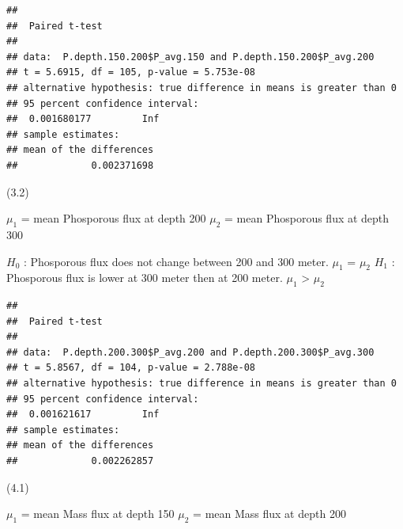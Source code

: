\documentclass[]{article}
\newenvironment{Shaded}{\begin{snugshade}}{\end{snugshade}}
\newcommand{\DataTypeTok}[1]{\textcolor[rgb]{0.13,0.29,0.53}{#1}}
\newcommand{\FloatTok}[1]{\textcolor[rgb]{0.00,0.00,0.81}{#1}}
\newcommand{\KeywordTok}[1]{\textcolor[rgb]{0.13,0.29,0.53}{\textbf{#1}}}
\newcommand{\NormalTok}[1]{#1}
\newcommand{\OperatorTok}[1]{\textcolor[rgb]{0.81,0.36,0.00}{\textbf{#1}}}
\newcommand{\OtherTok}[1]{\textcolor[rgb]{0.56,0.35,0.01}{#1}}
\newcommand{\StringTok}[1]{\textcolor[rgb]{0.31,0.60,0.02}{#1}}
\begin{document}
\begin{verbatim}
## 
##  Paired t-test
## 
## data:  P.depth.150.200$P_avg.150 and P.depth.150.200$P_avg.200
## t = 5.6915, df = 105, p-value = 5.753e-08
## alternative hypothesis: true difference in means is greater than 0
## 95 percent confidence interval:
##  0.001680177         Inf
## sample estimates:
## mean of the differences 
##             0.002371698
\end{verbatim}

(3.2)

\(\mu_1\) = mean Phosporous flux at depth 200 \(\mu_2\) = mean
Phosporous flux at depth 300

\(H_0\) : Phosporous flux does not change between 200 and 300 meter.
\(\mu_1\) = \(\mu_2\) \(H_1\) : Phosporous flux is lower at 300 meter
then at 200 meter. \(\mu_1\) \textgreater{} \(\mu_2\)

\begin{Shaded}
\end{Shaded}

\begin{verbatim}
## 
##  Paired t-test
## 
## data:  P.depth.200.300$P_avg.200 and P.depth.200.300$P_avg.300
## t = 5.8567, df = 104, p-value = 2.788e-08
## alternative hypothesis: true difference in means is greater than 0
## 95 percent confidence interval:
##  0.001621617         Inf
## sample estimates:
## mean of the differences 
##             0.002262857
\end{verbatim}

(4.1)

\(\mu_1\) = mean Mass flux at depth 150 \(\mu_2\) = mean Mass flux at
depth 200
\end{document}
